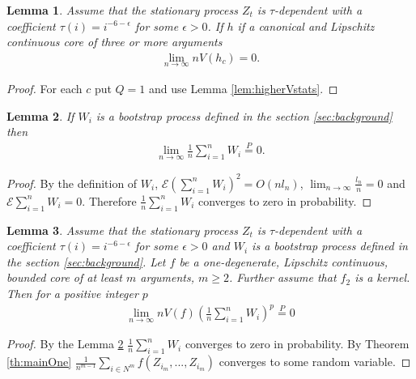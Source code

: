 \documentclass{article} %
\newtheorem{lemma}{Lemma}
\newcommand{\ev}{\mathcal{E}}
\begin{document}
\begin{lemma}
\label{lem:higherVstats2}
Assume that the stationary process $Z_t$ is $\tau$-dependent with a coefficient $\tau(i) = i^{-6-\epsilon}$ for some $\epsilon>0$. If $h$ if a canonical and Lipschitz continuous core of three or more arguments  
\begin{align}
\lim_{n \to \infty} n V(h_c) = 0.
\end{align}
\end{lemma}
\begin{proof}
For each $c$ put $Q=1$ and use Lemma \ref{lem:higherVstats}.
\end{proof}





\begin{lemma}
\label{lem:meanWi}
If $W_i$ is a bootstrap process defined in the section \ref{sec:background} then
\begin{align}
\lim_{n \to \infty} \frac 1 n \sum_{i=1}^n W_i \overset{P}{=} 0.
\end{align}
\end{lemma}
\begin{proof}
By the definition of $W_i$, $\ev (\sum_{i=1}^n W_i)^2 = O(n l_n)$,  $\lim_{n \to \infty} \frac {l_n}{n} =0 $ and $\ev \sum_{i=1}^n W_i = 0$. Therefore $\frac{1} {n} \sum_{i=1}^{n}W_i$ converges to zero in probability.
\end{proof}





\begin{lemma}
\label{lem:toZeroWi}
Assume that the stationary process $Z_t$ is $\tau$-dependent with a coefficient $\tau(i) = i^{-6-\epsilon}$ for some $\epsilon>0$ and $W_i$ is a bootstrap process defined in the section \ref{sec:background}. Let $f$ be a one-degenerate, Lipschitz continuous, bounded core of at least $m$ arguments, $m \geq 2$. Further assume that $f_2$ is a kernel. Then for a positive integer $p$
\begin{align}
\lim_{n \to \infty } n V(f) \left( \frac 1 n \sum_{i=1}^n W_i \right)^p \overset{P}{=} 0
\end{align}
\end{lemma}

\begin{proof}
By  the Lemma \ref{lem:meanWi} $\frac{1} {n} \sum_{i=1}^{n}W_i$ converges to zero in probability. By Theorem \ref{th:mainOne} $ \frac {1}{n^{m-1}} \sum_{i \in N^m} f(Z_{i_m},...,Z_{i_m}) $ converges to some random variable. 
\end{proof}
\end{document}
